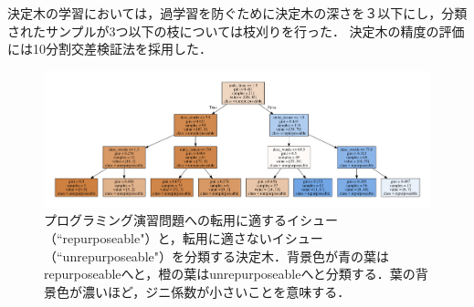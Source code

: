 

決定木の学習においては，過学習を防ぐために決定木の深さを３以下にし，分類されたサンプルが3つ以下の枝については枝刈りを行った．
決定木の精度の評価には10分割交差検証法を採用した．




\begin{figure}[t]
	\centering
  \includegraphics[width=1.0\columnwidth]{graph_20181005.png}
  \caption{プログラミング演習問題への転用に適するイシュー（``repurposeable"）と，転用に適さないイシュー（``unrepurposeable"）を分類する決定木．背景色が青の葉はrepurposeableへと，橙の葉はunrepurposeableへと分類する．葉の背景色が濃いほど，ジニ係数が小さいことを意味する．}
  \label{fig:dtgraph}
\end{figure}


